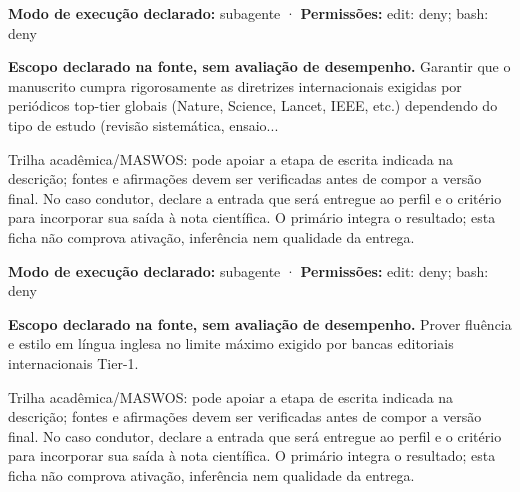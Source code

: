 \begin{arquitetura}
\textbf{Modo de execução declarado:} subagente · \textbf{Permissões:} edit: deny; bash: deny
\end{arquitetura}


\begin{descricao}
\textbf{Escopo declarado na fonte, sem avaliação de desempenho.}
Garantir que o manuscrito cumpra rigorosamente as diretrizes internacionais exigidas por periódicos top-tier globais (Nature, Science, Lancet, IEEE, etc.) dependendo do tipo de estudo (revisão sistemática, ensaio...
\end{descricao}

\begin{funcao}
Trilha acadêmica/MASWOS: pode apoiar a etapa de escrita indicada na descrição; fontes e afirmações devem ser verificadas antes de compor a versão final. No caso condutor, declare a entrada que será entregue ao perfil e o critério para incorporar sua saída à nota científica. O primário integra o resultado; esta ficha não comprova ativação, inferência nem qualidade da entrega.
\end{funcao}

\begin{arquitetura}
\textbf{Modo de execução declarado:} subagente · \textbf{Permissões:} edit: deny; bash: deny
\end{arquitetura}


\begin{descricao}
\textbf{Escopo declarado na fonte, sem avaliação de desempenho.}
Prover fluência e estilo em língua inglesa no limite máximo exigido por bancas editoriais internacionais Tier-1.
\end{descricao}

\begin{funcao}
Trilha acadêmica/MASWOS: pode apoiar a etapa de escrita indicada na descrição; fontes e afirmações devem ser verificadas antes de compor a versão final. No caso condutor, declare a entrada que será entregue ao perfil e o critério para incorporar sua saída à nota científica. O primário integra o resultado; esta ficha não comprova ativação, inferência nem qualidade da entrega.
\end{funcao}

